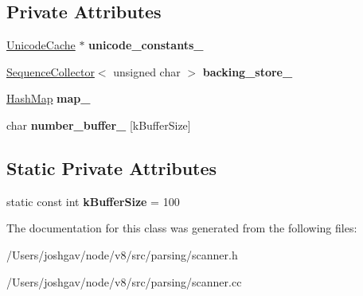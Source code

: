 \subsection*{Private Attributes}
\begin{DoxyCompactItemize}
\item 
\hyperlink{classv8_1_1internal_1_1_unicode_cache}{Unicode\+Cache} $\ast$ {\bfseries unicode\+\_\+constants\+\_\+}\hypertarget{classv8_1_1internal_1_1_duplicate_finder_a8529099f83779bddc0477989c21cfcb6}{}\label{classv8_1_1internal_1_1_duplicate_finder_a8529099f83779bddc0477989c21cfcb6}

\item 
\hyperlink{classv8_1_1internal_1_1_sequence_collector}{Sequence\+Collector}$<$ unsigned char $>$ {\bfseries backing\+\_\+store\+\_\+}\hypertarget{classv8_1_1internal_1_1_duplicate_finder_aefce1329e2e6248abfe9b2b1290b66a2}{}\label{classv8_1_1internal_1_1_duplicate_finder_aefce1329e2e6248abfe9b2b1290b66a2}

\item 
\hyperlink{classv8_1_1internal_1_1_template_hash_map_impl}{Hash\+Map} {\bfseries map\+\_\+}\hypertarget{classv8_1_1internal_1_1_duplicate_finder_a3a40957fe801c70409d033c9db3ceccf}{}\label{classv8_1_1internal_1_1_duplicate_finder_a3a40957fe801c70409d033c9db3ceccf}

\item 
char {\bfseries number\+\_\+buffer\+\_\+} \mbox{[}k\+Buffer\+Size\mbox{]}\hypertarget{classv8_1_1internal_1_1_duplicate_finder_aedaecb773ccf6011b5cff60134153e42}{}\label{classv8_1_1internal_1_1_duplicate_finder_aedaecb773ccf6011b5cff60134153e42}

\end{DoxyCompactItemize}
\subsection*{Static Private Attributes}
\begin{DoxyCompactItemize}
\item 
static const int {\bfseries k\+Buffer\+Size} = 100\hypertarget{classv8_1_1internal_1_1_duplicate_finder_a4e563cc2e9c9a4c1109f520ac023ea7b}{}\label{classv8_1_1internal_1_1_duplicate_finder_a4e563cc2e9c9a4c1109f520ac023ea7b}

\end{DoxyCompactItemize}


The documentation for this class was generated from the following files\+:\begin{DoxyCompactItemize}
\item 
/\+Users/joshgav/node/v8/src/parsing/scanner.\+h\item 
/\+Users/joshgav/node/v8/src/parsing/scanner.\+cc\end{DoxyCompactItemize}
